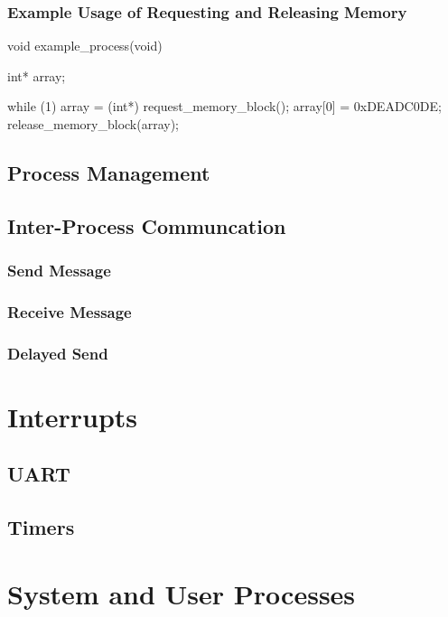 \documentclass[se]{uw-wkrpt}
\begin{document}
\subsubsection{Example Usage of Requesting and Releasing Memory}
\begin{code}
void example_process(void) {
    int* array;
    
    while (1) {
        array = (int*) request_memory_block();
        array[0] = 0xDEADC0DE;
        release_memory_block(array);
    }
}
\end{code}

\subsection{Process Management}

\subsection{Inter-Process Communcation}

\subsubsection{Send Message}

\subsubsection{Receive Message}

\subsubsection{Delayed Send}

\section{Interrupts}\label{sec:interupt}

\subsection{UART}

\subsection{Timers}

\section{System and User Processes}\label{sec:proc}
\end{document}
